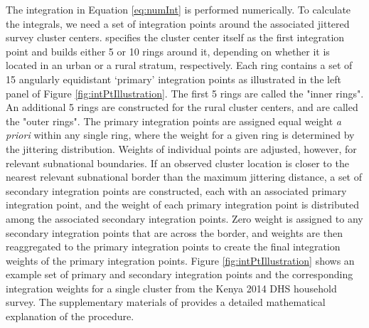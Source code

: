 The integration in Equation \eqref{eq:numInt} is performed numerically. To calculate the integrals, we need a set of integration points around the associated jittered survey cluster centers.  specifies the cluster center itself as the first integration point and builds either 5 or 10 rings around it, depending on whether it is located in an urban or a rural stratum, respectively. Each ring contains a set of 15 angularly equidistant `primary' integration points as illustrated in the left panel of Figure \ref{fig:intPtIllustration}.
The first 5 rings are called the "inner rings". An additional 5 rings are constructed for the rural cluster centers, and are called the "outer rings". The primary integration points are assigned equal weight \textit{a priori} within any single ring, where the weight for a given ring is determined by the jittering distribution. Weights of individual points are adjusted, however, for relevant subnational boundaries. If an observed cluster location is closer to the nearest relevant subnational border than the maximum jittering distance, a set of secondary integration points are constructed, each with an associated primary integration point, and the weight of each primary integration point is distributed among the associated secondary integration points. Zero weight is assigned to any secondary integration points that are across the border, and weights are then reaggregated to the primary integration points to create the final integration weights of the primary integration points. Figure \ref{fig:intPtIllustration} shows an example set of primary and secondary integration points and the corresponding integration weights for a single cluster from the Kenya 2014 DHS household survey. The supplementary materials of \citep{altay2022accounting} provides a detailed mathematical explanation of the procedure.

